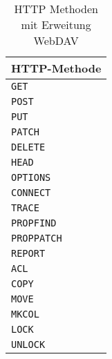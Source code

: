 \begin{table}[h]
  \centering
  \begin{tabular}{l}
    \toprule
    \textbf{HTTP-Methode} \\
    \midrule
    \verb=GET=   \\
    \verb=POST=  \\
    \verb=PUT=  \\
    \verb=PATCH=  \\
    \verb=DELETE=  \\
    \verb=HEAD=  \\
    \verb=OPTIONS=  \\
    \verb=CONNECT=  \\
    \verb=TRACE=  \\
    \verb=PROPFIND=  \\
    \verb=PROPPATCH=   \\
    \verb=REPORT=  \\
    \verb=ACL=  \\
    \verb=COPY=  \\
    \verb=MOVE=  \\
    \verb=MKCOL=  \\
    \verb=LOCK=  \\
    \verb=UNLOCK=  \\
    \bottomrule
  \end{tabular}
  
  \caption{HTTP Methoden mit Erweitung WebDAV}
  \medskip
  \label{tab:httpmethods}
\end{table}

